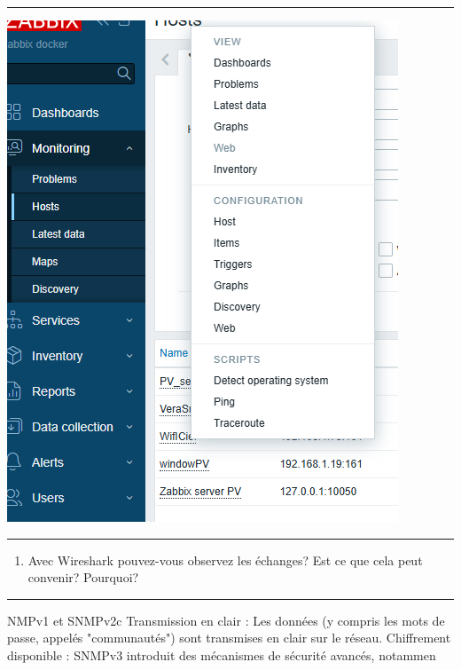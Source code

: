 \documentclass[french, 12pt]{article}%
\newif\ifPROF
\begin{document}
\begin{center}
 \rule{0.75\linewidth}{1pt}
 \end{center}

\begin{center}
\includegraphics[scale=0.4]{./ressource/zabbixObservation}
\end{center}


\begin{center}
 \rule{0.75\linewidth}{1pt}
 \end{center}

\begin{enumerate}[resume]
\item Avec Wireshark pouvez-vous observez les échanges? Est ce que cela peut convenir? Pourquoi? 
\end{enumerate}

\begin{center}
 \rule{0.75\linewidth}{1pt}
 \end{center}

\ifPROF
\color{red}
NMPv1 et SNMPv2c
Transmission en clair : Les données (y compris les mots de passe, appelés "communautés") sont transmises en clair sur le réseau.
Chiffrement disponible : SNMPv3 introduit des mécanismes de sécurité avancés, notammen
\end{document}
